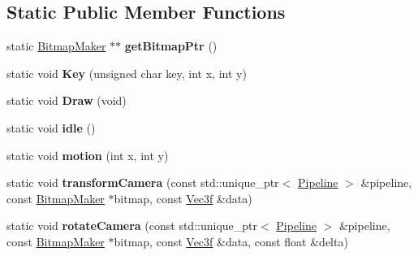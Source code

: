 \subsection*{Static Public Member Functions}
\begin{DoxyCompactItemize}
\item 
static \hyperlink{class_bitmap_maker}{Bitmap\+Maker} $\ast$$\ast$ {\bfseries get\+Bitmap\+Ptr} ()\hypertarget{class_bitmap_maker_a552fe60cbd4bb0cee2abab954d3d035a}{}\label{class_bitmap_maker_a552fe60cbd4bb0cee2abab954d3d035a}

\item 
static void {\bfseries Key} (unsigned char key, int x, int y)\hypertarget{class_bitmap_maker_a5419c10622f3287678904cfe33bded58}{}\label{class_bitmap_maker_a5419c10622f3287678904cfe33bded58}

\item 
static void {\bfseries Draw} (void)\hypertarget{class_bitmap_maker_a7fbe404cf3772e9f00af0f80b8afa781}{}\label{class_bitmap_maker_a7fbe404cf3772e9f00af0f80b8afa781}

\item 
static void {\bfseries idle} ()\hypertarget{class_bitmap_maker_a0103e8746802fc4f2af3ce16a9a11613}{}\label{class_bitmap_maker_a0103e8746802fc4f2af3ce16a9a11613}

\item 
static void {\bfseries motion} (int x, int y)\hypertarget{class_bitmap_maker_af7d3a02f076e5ac261fc12ab66be9519}{}\label{class_bitmap_maker_af7d3a02f076e5ac261fc12ab66be9519}

\item 
static void {\bfseries transform\+Camera} (const std\+::unique\+\_\+ptr$<$ \hyperlink{class_pipeline}{Pipeline} $>$ \&pipeline, const \hyperlink{class_bitmap_maker}{Bitmap\+Maker} $\ast$bitmap, const \hyperlink{class_vec3}{Vec3f} \&data)\hypertarget{class_bitmap_maker_a8ea46e4e115677c1b5b52decb1e516a9}{}\label{class_bitmap_maker_a8ea46e4e115677c1b5b52decb1e516a9}

\item 
static void {\bfseries rotate\+Camera} (const std\+::unique\+\_\+ptr$<$ \hyperlink{class_pipeline}{Pipeline} $>$ \&pipeline, const \hyperlink{class_bitmap_maker}{Bitmap\+Maker} $\ast$bitmap, const \hyperlink{class_vec3}{Vec3f} \&data, const float \&delta)\hypertarget{class_bitmap_maker_a0bcc8f4a244f10901f4326ff020bb5a4}{}\label{class_bitmap_maker_a0bcc8f4a244f10901f4326ff020bb5a4}

\end{DoxyCompactItemize}
